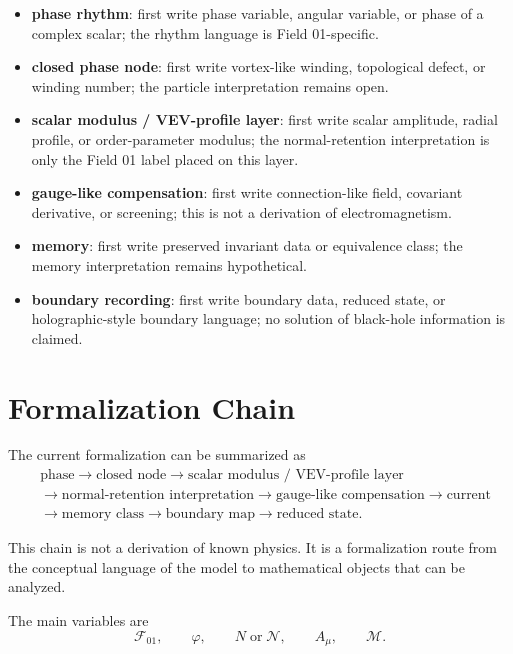 \documentclass[11pt,a4paper]{article}
\newcommand{\field}{\mathcal{F}_{01}}
\newcommand{\phase}{\varphi}
\newcommand{\normal}{\mathcal{N}}
\newcommand{\memory}{\mathcal{M}}
\begin{document}
\begin{itemize}
\item \textbf{phase rhythm}: first write phase variable, angular variable, or phase of a complex scalar; the rhythm language is Field 01-specific.
\item \textbf{closed phase node}: first write vortex-like winding, topological defect, or winding number; the particle interpretation remains open.
\item \textbf{scalar modulus / VEV-profile layer}: first write scalar amplitude, radial profile, or order-parameter modulus; the normal-retention interpretation is only the Field 01 label placed on this layer.
\item \textbf{gauge-like compensation}: first write connection-like field, covariant derivative, or screening; this is not a derivation of electromagnetism.
\item \textbf{memory}: first write preserved invariant data or equivalence class; the memory interpretation remains hypothetical.
\item \textbf{boundary recording}: first write boundary data, reduced state, or holographic-style boundary language; no solution of black-hole information is claimed.
\end{itemize}

\section{Formalization Chain}

The current formalization can be summarized as
\begin{align}
&\text{phase}
\rightarrow \text{closed node}
\rightarrow \text{scalar modulus / VEV-profile layer}
\nonumber\\
&\rightarrow \text{normal-retention interpretation}
\rightarrow \text{gauge-like compensation}
\rightarrow \text{current}
\nonumber\\
&\rightarrow \text{memory class}
\rightarrow \text{boundary map}
\rightarrow \text{reduced state}.
\end{align}

This chain is not a derivation of known physics. It is a formalization route from the conceptual language of the model to mathematical objects that can be analyzed.

The main variables are
\begin{equation}
\field, \qquad \phase, \qquad N \;\text{or}\; \normal, \qquad A_\mu, \qquad \memory.
\end{equation}
\end{document}

